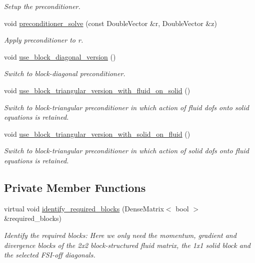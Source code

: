 \begin{DoxyCompactItemize}
\begin{DoxyCompactList}\small\item\em Setup the preconditioner. \end{DoxyCompactList}\item 
void \hyperlink{classoomph_1_1SimpleFSIPreconditioner_a31684c26aa10a782189c32304d9d0824}{preconditioner\+\_\+solve} (const Double\+Vector \&r, Double\+Vector \&z)
\begin{DoxyCompactList}\small\item\em Apply preconditioner to r. \end{DoxyCompactList}\item 
void \hyperlink{classoomph_1_1SimpleFSIPreconditioner_a9e4313b890f586d4e1fb406a1b9d3948}{use\+\_\+block\+\_\+diagonal\+\_\+version} ()
\begin{DoxyCompactList}\small\item\em Switch to block-\/diagonal preconditioner. \end{DoxyCompactList}\item 
void \hyperlink{classoomph_1_1SimpleFSIPreconditioner_ae996d56f6e94d88967e8aad4e664ee74}{use\+\_\+block\+\_\+triangular\+\_\+version\+\_\+with\+\_\+fluid\+\_\+on\+\_\+solid} ()
\begin{DoxyCompactList}\small\item\em Switch to block-\/triangular preconditioner in which action of fluid dofs onto solid equations is retained. \end{DoxyCompactList}\item 
void \hyperlink{classoomph_1_1SimpleFSIPreconditioner_a888de44acd9583fe7cce949a461dfc56}{use\+\_\+block\+\_\+triangular\+\_\+version\+\_\+with\+\_\+solid\+\_\+on\+\_\+fluid} ()
\begin{DoxyCompactList}\small\item\em Switch to block-\/triangular preconditioner in which action of solid dofs onto fluid equations is retained. \end{DoxyCompactList}\end{DoxyCompactItemize}
\subsection*{Private Member Functions}
\begin{DoxyCompactItemize}
\item 
virtual void \hyperlink{classoomph_1_1SimpleFSIPreconditioner_abaf505c05ec128f4c3c6ff5036fb3db1}{identify\+\_\+required\+\_\+blocks} (Dense\+Matrix$<$ bool $>$ \&required\+\_\+blocks)
\begin{DoxyCompactList}\small\item\em Identify the required blocks\+: Here we only need the momentum, gradient and divergence blocks of the 2x2 block-\/structured fluid matrix, the 1x1 solid block and the selected F\+S\+I-\/off diagonals. \end{DoxyCompactList}\end{DoxyCompactItemize}
